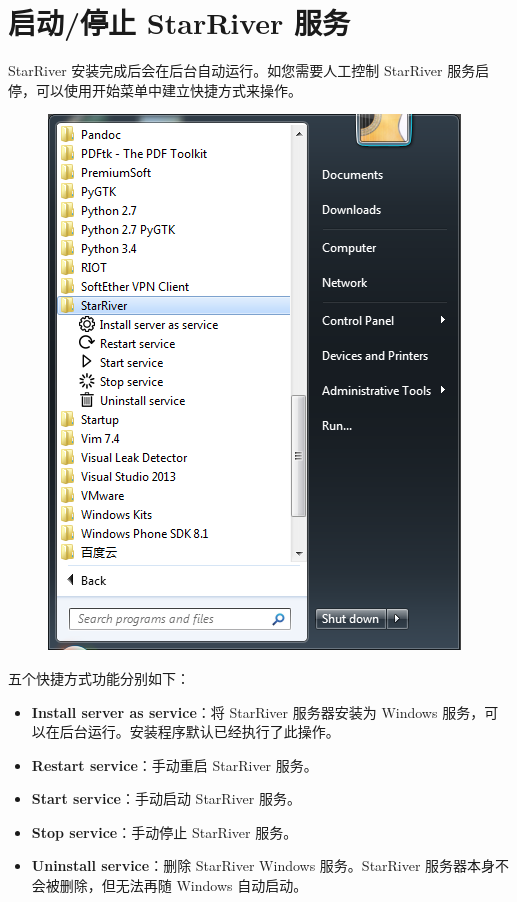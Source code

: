 \section{启动/停止 StarRiver
服务}\label{ux542fux52a8ux505cux6b62-starriver-ux670dux52a1}

StarRiver 安装完成后会在后台自动运行。如您需要人工控制 StarRiver
服务启停，可以使用开始菜单中建立快捷方式来操作。

\begin{figure}[htbp]
\centering
\includegraphics{img/shortcuts.png}
\caption{}
\end{figure}

五个快捷方式功能分别如下：

\begin{itemize}
\itemsep1pt\parskip0pt
\item
  \textbf{Install server as service}：将 StarRiver 服务器安装为 Windows
  服务，可以在后台运行。安装程序默认已经执行了此操作。
\item
  \textbf{Restart service}：手动重启 StarRiver 服务。
\item
  \textbf{Start service}：手动启动 StarRiver 服务。
\item
  \textbf{Stop service}：手动停止 StarRiver 服务。
\item
  \textbf{Uninstall service}：删除 StarRiver Windows 服务。StarRiver
  服务器本身不会被删除，但无法再随 Windows 自动启动。
\end{itemize}

